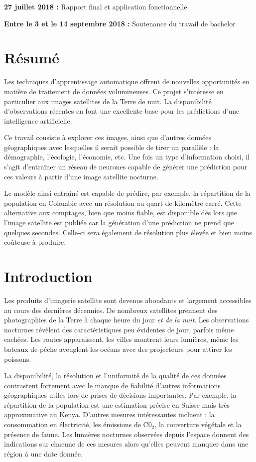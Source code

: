 \documentclass[a4paper, 11pt]{report}
\begin{document}
\textbf{27 juillet 2018 :} Rapport final et application fonctionnelle

\textbf{Entre le 3 et le 14 septembre 2018 :} Soutenance du travail de bachelor

\chapter{Résumé}

Les techniques d'apprentissage automatique offrent de nouvelles opportunités en matière de traitement de données volumineuses. Ce projet s'intéresse en particulier aux images satellites de la Terre de nuit. La disponibilité d'observations récentes en font une excellente base pour les prédictions d'une intelligence artificielle.

Ce travail consiste à explorer ces images, ainsi que d'autres données géographiques avec lesquelles il serait possible de tirer un parallèle : la démographie, l'écologie, l'économie, etc. Une fois un type d'information choisi, il s'agit d'entraîner un réseau de neurones capable de générer une prédiction pour ces valeurs à partir d'une image satellite nocturne.

Le modèle ainsi entraîné est capable de prédire, par exemple, la répartition de la population en Colombie avec un résolution au quart de kilomètre carré. Cette alternative aux comptages, bien que moins fiable, est disponible dès lors que l'image satellite est publiée car la génération d'une prédiction ne prend que quelques secondes. Celle-ci sera également de résolution plus élevée et bien moins coûteuse à produire.

\chapter{Introduction}
Les produits d'imagerie satellite sont devenus abondants et largement accessibles au cours des dernières décennies. De nombreux satellites prennent des photographies de la Terre à chaque heure du jour \textit{et de la nuit}. Les observations nocturnes révèlent des caractéristiques peu évidentes de jour, parfois même cachées. Les routes apparaissent, les villes montrent leurs lumières, même les bateaux de pêche aveuglent les océans avec des projecteurs pour attirer les poissons.

La disponibilité, la résolution et l'uniformité de la qualité de ces données contrastent fortement avec le manque de fiabilité d'autres informations géographiques utiles lors de prises de décisions importantes. Par exemple, la répartition de la population est une estimation précise en Suisse mais très approximative au Kenya. D'autres mesures intéressantes incluent : la consommation en électricité, les émissions de C0$_2$, la couverture végétale et la présence de faune. Les lumières nocturnes observées depuis l'espace donnent des indications sur chacune de ces mesures alors qu'elles peuvent manquer dans une région à une date donnée.
\end{document}
